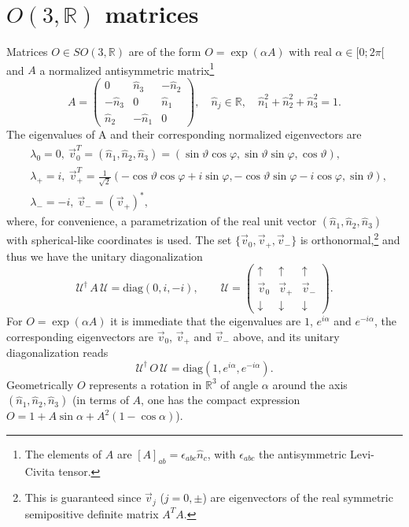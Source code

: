 \documentclass[12pt,a4paper]{article}
\begin{document}
\section{$O(3,\mathbb{R})$ matrices\label{APP:O3}}
Matrices $O\in SO(3,\mathbb{R})$ are of the form $O=\exp (\alpha A)$ with real $\alpha\in[0;2\pi[$ and $A$ a normalized antisymmetric matrix\footnote{The elements of $A$ are $[A]_{ab}=\epsilon_{abc}\hat n_c$, with $\epsilon_{abc}$ the antisymmetric Levi-Civita tensor.}
\begin{equation}\label{eq:O3:A:00}
 A=\begin{pmatrix} 0&\hat n_3& -\hat n_2\\ -\hat n_3&0&\hat n_1\\ \hat n_2&-\hat n_1&0\end{pmatrix},\quad \hat n_j\in\mathbb{R},\quad 
 \hat n_1^2+\hat n_2^2+\hat n_3^2=1.
\end{equation}
The eigenvalues of A and their corresponding normalized eigenvectors are
\begin{equation}
 \begin{aligned}
   &\lambda_0=0,\ \vec v_{0}^T=(\hat n_1,\hat n_2,\hat n_3)=(\sin\vartheta\cos\varphi,\sin\vartheta\sin\varphi,\cos\vartheta),\\
   &\lambda_{+}=i,\ \vec v_{+}^T=\frac{1}{\sqrt 2}(-\cos\vartheta\cos\varphi+i\sin\varphi,-\cos\vartheta\sin\varphi-i\cos\varphi,\sin\vartheta),\\
   &\lambda_{-}=-i,\ \vec v_{-}=(\vec v_{+})^\ast,
 \end{aligned}
\end{equation}
where, for convenience, a parametrization of the real unit vector $(\hat n_1,\hat n_2,\hat n_3)$ with spherical-like coordinates is used. The set $\{\vec v_0,\vec v_+,\vec v_-\}$ is orthonormal,\footnote{This is guaranteed since $\vec v_j$ ($j=0,\pm$) are eigenvectors of the real symmetric semipositive definite matrix $A^TA$.} and thus we have the unitary diagonalization
\begin{equation}
\mathcal U^\dagger\,A\,\mathcal U=\text{diag}(0,i,-i),\qquad 
 \mathcal U=\begin{pmatrix}\uparrow &\uparrow&\uparrow\\ \vec v_0&\vec v_+&\vec v_-\\ \downarrow&\downarrow&\downarrow\end{pmatrix}.
\end{equation}
For $O=\exp(\alpha A)$ it is immediate that the eigenvalues are $1$, $e^{i\alpha}$ and $e^{-i\alpha}$, the corresponding eigenvectors are $\vec v_0$, $\vec v_+$ and $\vec v_-$ above, and its unitary diagonalization reads
\begin{equation}
\mathcal U^\dagger\,O\,\mathcal U= \text{diag}(1,e^{i\alpha},e^{-i\alpha}).
\end{equation}
Geometrically $O$ represents a rotation in $\mathbb{R}^3$ of angle $\alpha$ around the axis $(\hat n_1,\hat n_2,\hat n_3)$ (in terms of $A$, one has the compact expression $O=1+A\sin\alpha+A^2(1-\cos\alpha)$).
\end{document}
